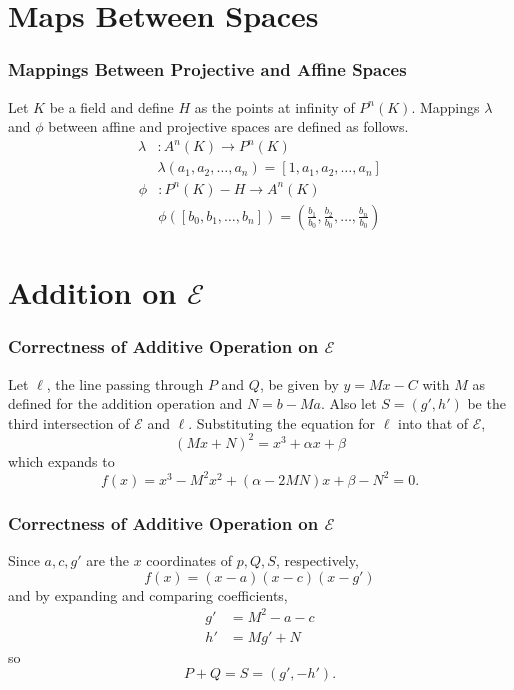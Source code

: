 \documentclass{beamer}
\begin{document}
    \section{Maps Between Spaces}
    \begin{frame}[label=maps]
        \frametitle{Mappings Between Projective and Affine Spaces}
        Let \(K\) be a field and define \(H\) as the points at infinity
        of \(P^n(K)\). Mappings \(\lambda\) and \(\phi\) between
        affine and projective spaces are defined as follows.
        \begin{align*}
            \lambda&: A^n(K) \to P^n(K) \\
            &\lambda(a_1, a_2, \dots, a_n) = [1, a_1, a_2, \dots, a_n]
        \end{align*}
        \begin{align*}
            \phi&: P^n(K) - H \to A^n(K) \\
            &\phi([b_0, b_1, \dots, b_n]) =
                \left(\frac{b_1}{b_0}, \frac{b_2}{b_0}, \dots,
                \frac{b_n}{b_0}\right)
        \end{align*}
        \hyperlink{forms}{}
    \end{frame}

    \section{Addition on \(\mathcal{E}\)}
    \begin{frame}[label=addproof]
        \frametitle{Correctness of Additive Operation on \(\mathcal{E}\)}
        Let \(\ell\), the line passing through \(P\) and \(Q\), be given by
        \(y = Mx - C\) with \(M\) as defined for the addition
        operation and \(N = b - Ma\). Also let \(S = (g', h')\) be the third
        intersection of
        \(\mathcal{E}\) and \(\ell\). Substituting the equation for \(\ell\)
        into that of \(\mathcal{E}\),
        \[(Mx + N)^2 = x^3 + \alpha x + \beta\] which expands to
        \[f(x) = x^3 - M^2x^2 + (\alpha - 2MN)x + \beta - N^2 = 0.\]
    \end{frame}
    \begin{frame}
        \frametitle{Correctness of Additive Operation on \(\mathcal{E}\)}
        Since \(a, c, g'\) are the \(x\) coordinates of \(p, Q, S\),
        respectively,
        \[f(x) = (x - a)(x - c)(x - g')\]
        and by expanding and comparing coefficients,
        \begin{align*}
            g' &= M^2 - a - c \\
            h' &= Mg' + N
        \end{align*}
        so
        \[P + Q = S = (g', -h').\]
        \hyperlink{add}{}
    \end{frame}
\end{document}
